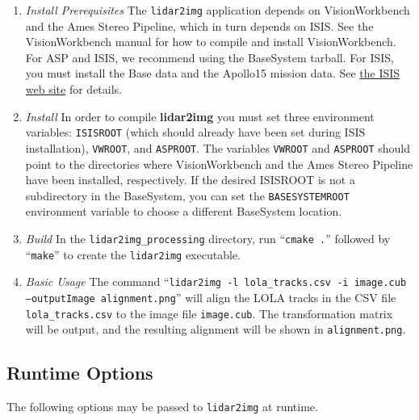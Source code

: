 \begin{enumerate}
	\item{\emph{Install Prerequisites}} The {\texttt{lidar2img}} application depends on VisionWorkbench and the
		Ames Stereo Pipeline, which in turn depends on ISIS. See the VisionWorkbench manual
		for how to compile and install VisionWorkbench. For ASP and ISIS, we recommend using
		the BaseSystem tarball. %
		For ISIS, you must install the Base data and the Apollo15 mission data. See
		\href{http://isis.astrogeology.usgs.gov/}{the ISIS web site} for details.
	\item{\emph{Install }}
		In order to compile {\bf{lidar2img}} you must set three environment variables:
		{\texttt{ISISROOT}} (which should already have been set during ISIS installation),
		{\texttt{VWROOT}}, and {\texttt{ASPROOT}}. The variables {\texttt{VWROOT}} and
		{\texttt{ASPROOT}} should point to the directories where VisionWorkbench and the
		Ames Stereo Pipeline have been installed, respectively. If the desired ISISROOT
		is not a subdirectory in the BaseSystem, you can set the {\texttt{BASESYSTEMROOT}}
		environment variable to choose a different BaseSystem location.
	\item{\emph{Build }}
		In the \texttt{lidar2img\_processing} directory, run ``\texttt{cmake .}'' followed by
		``\texttt{make}'' to create the {\texttt{lidar2img}} executable.
	\item{\emph{Basic Usage}}
		The command ``\texttt{lidar2img -l lola\_tracks.csv -i image.cub --outputImage alignment.png}'' will
		align the LOLA tracks in the CSV file \texttt{lola\_tracks.csv} to the image file \texttt{image.cub}.
		The transformation matrix will be output, and the resulting alignment will be shown in \texttt{alignment.png}.
\end{enumerate}

\subsection{Runtime Options}

The following options may be passed to {\texttt{lidar2img}} at runtime.

